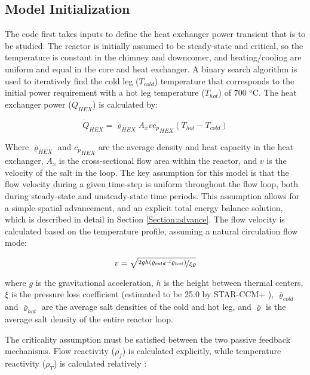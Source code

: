 \subsection{Model Initialization}\label{Section:initial}
The code first takes inputs to define the heat exchanger power transient that is to be studied. The reactor is initially assumed to be steady-state and critical, so the temperature is constant in the chimney and downcomer, and heating/cooling are uniform and equal in the core and heat exchanger. A binary search algorithm is used to iteratively find the cold leg ($T_{cold}$) temperature that corresponds to the initial power requirement with a hot leg temperature ($T_{hot}$) of 700 $^o$C. The heat exchanger power ($\dot{Q}_{HEX}$) is calculated by:

\begin{equation}
    \dot{Q}_{HEX} = \bar{\varrho}_{HEX} A_x v \bar{c_p}_{HEX} (T_{hot} - T_{cold})
\end{equation}

Where $\bar{\varrho}_{HEX}$ and $\bar{c_p}_{HEX}$ are the average density and heat capacity in the heat exchanger, $A_x$ is the cross-sectional flow area within the reactor, and $v$ is the velocity of the salt in the loop. The key assumption for this model is that the flow velocity during a given time-step is uniform throughout the flow loop, both during steady-state and unsteady-state time periods. This assumption allows for a simple spatial advancement, and an explicit total energy balance solution, which is described in detail in Section \ref{Section:advance}. The flow velocity is calculated based on the temperature profile, assuming a natural circulation flow mode:

\begin{equation}\label{eq:saltvelo}
    v = \sqrt{\nicefrac{2gh(\varrho_{cold}-\varrho_{hot})}{\xi\varrho}}
\end{equation}

where $g$ is the gravitational acceleration, $h$ is the height between thermal centers, $\xi$ is the pressure loss coefficient (estimated to be 25.0 by STAR-CCM+ \cite{CarterNumerical}), $\bar{\varrho}_{cold}$ and $\bar{\varrho}_{hot}$ are the average salt densities of the cold and hot leg, and $\bar{\varrho}$ is the average salt density of the entire reactor loop.

The criticality assumption must be satisfied between the two passive feedback mechanisms. Flow reactivity ($\rho_f$) is calculated explicitly, while temperature reactivity ($\rho_T$) is calculated relatively \cite{Kerlin}:

